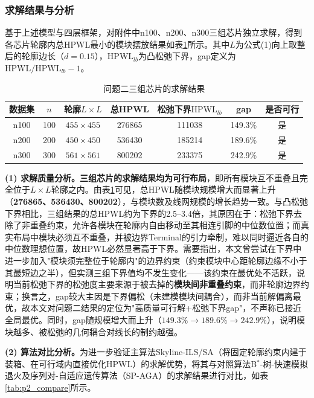 \documentclass{JXUSTmodeling}
\begin{document}
\subsubsection{求解结果与分析}
基于上述模型与四层框架，对附件中n100、n200、n300三组芯片独立求解，得到各芯片轮廓内总HPWL最小的模块摆放结果如表\ref{tab:p2_result}所示。其中$L$为公式(1)向上取整后的轮廓边长（$d=0.15$），$\mathrm{HPWL}_{lb}$为凸松弛下界，gap定义为$\mathrm{HPWL}/\mathrm{HPWL}_{lb}-1$。

\begin{table}[!htbp]
	\centering
	\caption{\label{tab:p2_result}问题二三组芯片的求解结果}
	\begin{tabular}{ccccccc}
		\toprule[1.5pt]
		数据集&$n$&轮廓$L\times L$&总HPWL&松弛下界$\mathrm{HPWL}_{lb}$&gap&是否可行\\
		\midrule
		n100&100&$455\times455$&276865&111038&149.3\%&是\\
		n200&200&$450\times450$&536430&185214&189.6\%&是\\
		n300&300&$561\times561$&800202&233375&242.9\%&是\\
		\bottomrule[1.5pt]
	\end{tabular}
\end{table}

\textbf{(1) 求解质量分析。}\textbf{三组芯片的求解结果均为可行布局}，即所有模块互不重叠且完全位于$L\times L$轮廓之内。由表\ref{tab:p2_result}可见，总HPWL随模块规模增大而显著上升（\textbf{276865、536430、800202}），与模块数及线网规模的增长趋势一致。与凸松弛下界相比，三组结果的总HPWL约为下界的2.5--3.4倍，其原因在于：松弛下界去除了非重叠约束，允许各模块在轮廓内自由移动至其相连引脚的中位数位置；而真实布局中模块必须互不重叠，并被边界Terminal的引力牵制，难以同时逼近各自的中位数理想位置，故HPWL必然显著高于下界。需要指出，本文曾尝试在下界中进一步加入"模块须完整位于轮廓内"的边界约束（约束模块中心距轮廓边缘不小于其最短边之半），但实测三组下界值均不发生变化——该约束在最优处不活跃，说明当前松弛下界的松弛度主要来源于被去掉的\textbf{模块间非重叠约束}，而非轮廓边界约束；换言之，gap较大主因是下界偏松（未建模模块间耦合），而非当前解偏离最优，故本文对问题二结果的定位为"高质量可行解+松弛下界gap"，不声称已接近全局最优。同时，gap随规模增大而上升（$149.3\%\to189.6\%\to242.9\%$），说明模块越多、被松弛的几何耦合对线长的制约越强。

\textbf{(2) 算法对比分析。}为进一步验证主算法Skyline-ILS/SA（将固定轮廓约束内建于装箱、在可行域内直接优化HPWL）的求解优势，将其与对照算法B${}^{\ast}$-树-快速模拟退火及序列对-自适应遗传算法（SP-AGA）的求解结果进行对比，如表\ref{tab:p2_compare}所示。
\end{document}
